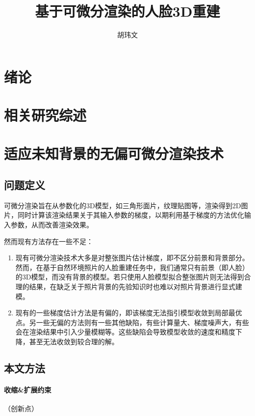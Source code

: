 \documentclass{ctexart}
\title{基于可微分渲染的人脸3D重建}
\author{胡玮文}
\begin{document}
\maketitle

\tableofcontents

\section{绪论}

\section{相关研究综述}

\section{适应未知背景的无偏可微分渲染技术}

\subsection{问题定义}

可微分渲染旨在从参数化的3D模型，如三角形面片，纹理贴图等，渲染得到2D图片，同时计算该渲染结果关于其输入参数的梯度，以期利用基于梯度的方法优化输入参数，从而改善渲染效果。

然而现有方法存在一些不足：
\begin{enumerate}
    \item 现有可微分渲染技术大多是对整张图片估计梯度，即不区分前景和背景部分。然而，在基于自然环境照片的人脸重建任务中，我们通常只有前景（即人脸）的3D模型，而没有背景的模型。若只使用人脸模型拟合整张图片则无法得到合理的结果，在缺乏关于照片背景的先验知识时也难以对照片背景进行显式建模。
    \item 现有的一些梯度估计方法是有偏的，即该梯度无法指引模型收敛到局部最优点。另一些无偏的方法则有一些其他缺陷，有些计算量大、梯度噪声大，有些会在渲染结果中引入少量模糊等。这些缺陷会导致模型收敛的速度和精度下降，甚至无法收敛到较合理的解。
\end{enumerate}

\subsection{本文方法}

\paragraph{收缩\&扩展约束}（创新点）
\end{document}
